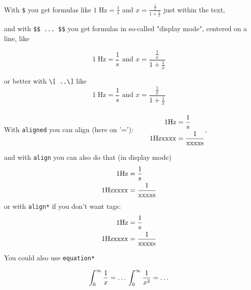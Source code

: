 \documentclass{ximera}
\begin{document}

With \verb|$| you get formulas like 
$1\;\textrm{Hz}=\frac{1}{\textrm{s}}$ and $ x =\frac{\frac1x}{1+\frac{1}{x}}$
just within the text,

and with \verb|$$ ... $$| you get formulas in so-called "display mode", centered on a line, like

$$
1\;\textrm{Hz}=\frac{1}{\textrm{s}} \text{ and } x =\frac{\frac1x}{1+\frac{1}{x}}
$$ 

or better with \verb|\[ ..\]|  like
\[
1\;\textrm{Hz}=\frac{1}{\textrm{s}} \text{ and } x =\frac{\frac1x}{1+\frac{1}{x}}
\] 
\\[1cm]
With \verb|aligned| you can align (here on '='):
$
\begin{aligned}
    \qquad 1 {\rm Hz}      & = \frac{1}{{\rm s}} \\
    \qquad 1 {\rm Hzxxxx}  & = \frac{1}{{\rm xxxxs}}
\end{aligned}
$,

and with \verb|align| you can also do that (in display mode)
\begin{align}
    1 {\rm Hz}      & = \frac{1}{{\rm s}} \\
    1 {\rm Hzxxxx}  & = \frac{1}{{\rm xxxxs}} \\
\end{align}
or with \verb|align*| if you don't want tags:
\begin{align*}
    1 {\rm Hz}      & = \frac{1}{{\rm s}} \\
    1 {\rm Hzxxxx}  & = \frac{1}{{\rm xxxxs}} \\
\end{align*}


You could also use \verb|equation*|

\begin{equation*}
    \int_0^\infty \frac{1}{x}  =  \ldots \\
    \int_0^\infty \frac{1}{x^2}  =  \ldots 
\end{equation*}

  
\end{document}
